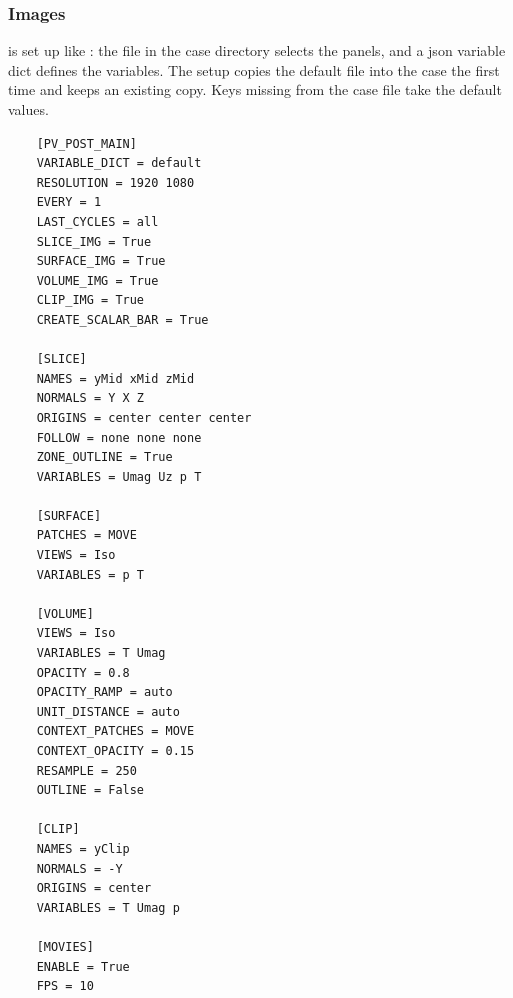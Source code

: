 \subsubsection{Images}
 is set up like : the file  in the case directory selects the panels, and a json variable dict defines the variables. The setup copies the default file into the case the first time and keeps an existing copy. Keys missing from the case file take the default values.
\begin{lstlisting}
    [PV_POST_MAIN]
    VARIABLE_DICT = default
    RESOLUTION = 1920 1080
    EVERY = 1
    LAST_CYCLES = all
    SLICE_IMG = True
    SURFACE_IMG = True
    VOLUME_IMG = True
    CLIP_IMG = True
    CREATE_SCALAR_BAR = True

    [SLICE]
    NAMES = yMid xMid zMid
    NORMALS = Y X Z
    ORIGINS = center center center
    FOLLOW = none none none
    ZONE_OUTLINE = True
    VARIABLES = Umag Uz p T

    [SURFACE]
    PATCHES = MOVE
    VIEWS = Iso
    VARIABLES = p T

    [VOLUME]
    VIEWS = Iso
    VARIABLES = T Umag
    OPACITY = 0.8
    OPACITY_RAMP = auto
    UNIT_DISTANCE = auto
    CONTEXT_PATCHES = MOVE
    CONTEXT_OPACITY = 0.15
    RESAMPLE = 250
    OUTLINE = False

    [CLIP]
    NAMES = yClip
    NORMALS = -Y
    ORIGINS = center
    VARIABLES = T Umag p

    [MOVIES]
    ENABLE = True
    FPS = 10
\end{lstlisting}
